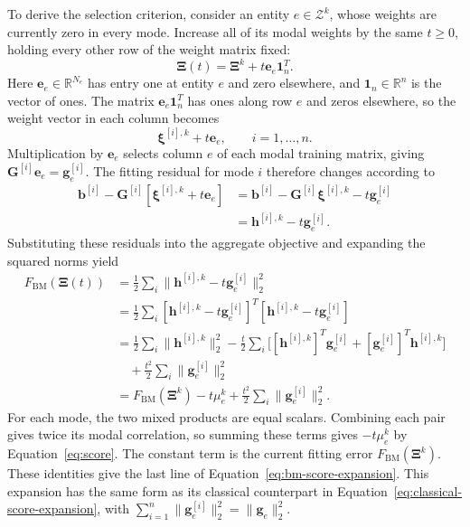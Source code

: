 \documentclass[a4paper,12pt]{article}
\newcommand{\vect}[1]{\boldsymbol{#1}}
\newcommand{\matr}[1]{\boldsymbol{#1}}
\begin{document}
To derive the selection criterion, consider an entity $e\in\mathcal Z^k$, whose weights are currently zero in every mode. Increase all of its modal weights by the same $t\geq0$, holding every other row of the weight matrix fixed:
\begin{equation}
 \matr{\Xi}(t)
 =\matr{\Xi}^k+t\vect{e}_e\vect{1}_n^T.
 \label{eq:bm-selection-direction}
\end{equation}
Here $\vect{e}_e\in\mathbb R^{N_e}$ has entry one at entity $e$ and zero elsewhere, and $\vect{1}_n\in\mathbb R^n$ is the vector of ones. The matrix $\vect{e}_e\vect{1}_n^T$ has ones along row $e$ and zeros elsewhere, so the weight vector in each column becomes
\[
 \vect{\xi}^{[i],k}+t\vect{e}_e,
 \qquad i=1,\ldots,n.
\]
Multiplication by $\vect{e}_e$ selects column $e$ of each modal training matrix, giving $\matr{G}^{[i]}\vect{e}_e=\vect{g}_e^{[i]}$. The fitting residual for mode $i$ therefore changes according to
\[
 \begin{aligned}
 \vect{b}^{[i]}-\matr{G}^{[i]}
               [\vect{\xi}^{[i],k}+t\vect{e}_e]
 &=\vect{b}^{[i]}-\matr{G}^{[i]}\vect{\xi}^{[i],k}
      -t\vect{g}_e^{[i]}\\
 &=\vect{h}^{[i],k}-t\vect{g}_e^{[i]}.
 \end{aligned}
\]
Substituting these residuals into the aggregate objective and expanding the squared norms yield
\begin{equation}
 \begin{aligned}
 F_{\mathrm{BM}}(\matr{\Xi}(t))
 &=\frac12\sum_i
        \|\vect{h}^{[i],k}-t\vect{g}_e^{[i]}\|_2^2\\
 &=\frac12\sum_i
        [\vect{h}^{[i],k}-t\vect{g}_e^{[i]}]^T
        [\vect{h}^{[i],k}-t\vect{g}_e^{[i]}]\\
 &=\frac12\sum_i\|\vect{h}^{[i],k}\|_2^2
    -\frac{t}{2}\sum_i
       \bigl[[\vect{h}^{[i],k}]^T\vect{g}_e^{[i]}
             +[\vect{g}_e^{[i]}]^T\vect{h}^{[i],k}\bigr]\\
 &\quad+\frac{t^2}{2}\sum_i\|\vect{g}_e^{[i]}\|_2^2\\
 &=F_{\mathrm{BM}}(\matr{\Xi}^k)
     -t\mu_e^k+\frac{t^2}{2}\sum_i\|\vect{g}_e^{[i]}\|_2^2.
 \end{aligned}
 \label{eq:bm-score-expansion}
\end{equation}
For each mode, the two mixed products are equal scalars. Combining each pair gives twice its modal correlation, so summing these terms gives $-t\mu_e^k$ by Equation~\eqref{eq:score}. The constant term is the current fitting error $F_{\mathrm{BM}}(\matr{\Xi}^k)$. These identities give the last line of Equation~\eqref{eq:bm-score-expansion}. This expansion has the same form as its classical counterpart in Equation~\eqref{eq:classical-score-expansion}, with $\sum_{i=1}^n\|\vect{g}_e^{[i]}\|_2^2=\|\vect{g}_e\|_2^2$.
\end{document}
